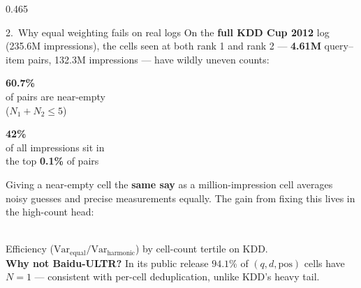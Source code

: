 \documentclass[final]{beamer}
\newcommand{\keynum}[2]{\begin{minipage}[t]{\linewidth}\centering
  {\fontsize{72}{78}\selectfont\color{accent}\textbf{#1}}\\[0.3em]{\normalsize\color{greytext}#2}\end{minipage}}
\begin{document}
\begin{frame}[t]{}
\begin{columns}[t]
\begin{column}{0.465\paperwidth}
\begin{block}{\textcolor{accent}{2.}\ Why equal weighting fails on real logs}
On the \textbf{full KDD Cup 2012} log (235.6M impressions), the cells seen at
both rank 1 and rank 2 --- \textbf{4.61M} query--item pairs, 132.3M impressions ---
have wildly uneven counts:
\smallskip
\begin{center}
\begin{minipage}{0.47\linewidth}\keynum{60.7\%}{of pairs are near-empty\\($N_1\!+\!N_2\le 5$)}\end{minipage}\hfill
\begin{minipage}{0.47\linewidth}\keynum{42\%}{of all impressions sit in\\the top \textbf{0.1\%} of pairs}\end{minipage}
\end{center}
\smallskip
Giving a near-empty cell the \textbf{same say} as a million-impression cell
averages noisy guesses and precise measurements equally. The gain
from fixing this lives in the high-count head:
\smallskip

\begin{center}
\\[0.1em]
{\small\color{greytext}Efficiency ($\mathrm{Var}_{\text{equal}}/\mathrm{Var}_{\text{harmonic}}$) by cell-count tertile on KDD.\\[0.1em]
\textbf{Why not Baidu-ULTR?} In its public release $94.1\%$ of $(q,d,\mathrm{pos})$ cells have $N{=}1$ --- consistent with per-cell deduplication, unlike KDD's heavy tail.}
\end{center}
\end{block}


\end{column}
\end{columns}
\end{frame}
\end{document}
